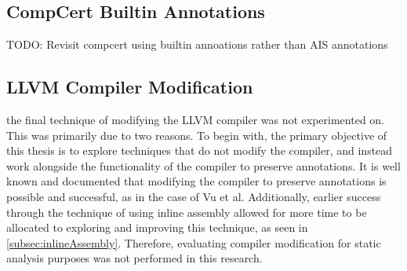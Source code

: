 \subsection{CompCert Builtin Annotations}
TODO: Revisit compcert using builtin annoations rather than AIS annotations

\subsection{LLVM Compiler Modification}
the final technique of modifying the LLVM compiler was not experimented on. This was primarily due to two reasons. To begin with, the primary objective of this thesis is to explore techniques that do not modify the compiler, and instead work alongside the functionality of the compiler to preserve annotations. It is well known and documented that modifying the compiler to preserve annotations is possible and successful, as in the case of Vu et al. \cite{vu2020secure} Additionally, earlier success through the technique of using inline assembly allowed for more time to be allocated to exploring and improving this technique, as seen in \ref{subsec:inlineAssembly}. Therefore, evaluating compiler modification for static analysis purposes was not performed in this research.

